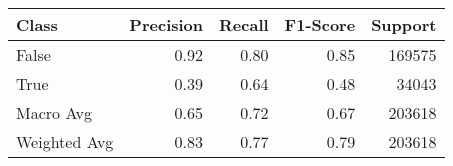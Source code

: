 \begin{tabular}{lrrrr}
\toprule
       Class &  Precision &  Recall &  F1-Score &  Support \\
\midrule
       False &       0.92 &    0.80 &      0.85 &   169575 \\
        True &       0.39 &    0.64 &      0.48 &    34043 \\
   Macro Avg &       0.65 &    0.72 &      0.67 &   203618 \\
Weighted Avg &       0.83 &    0.77 &      0.79 &   203618 \\
\bottomrule
\end{tabular}
